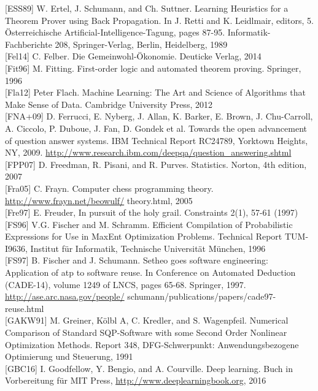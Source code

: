 \documentclass[10pt]{article}
\begin{document}
[ESS89] W. Ertel, J. Schumann, and Ch. Suttner. Learning Heuristics for a Theorem Prover using Back Propagation. In J. Retti and K. Leidlmair, editors, 5. Österreichische Artificial-Intelligence-Tagung, pages 87-95. Informatik-Fachberichte 208, Springer-Verlag, Berlin, Heidelberg, 1989\\[0pt]
[Fel14] C. Felber. Die Gemeinwohl-Ökonomie. Deuticke Verlag, 2014\\[0pt]
[Fit96] M. Fitting. First-order logic and automated theorem proving. Springer, 1996\\[0pt]
[Fla12] Peter Flach. Machine Learning: The Art and Science of Algorithms that Make Sense of Data. Cambridge University Press, 2012\\[0pt]
[FNA+09] D. Ferrucci, E. Nyberg, J. Allan, K. Barker, E. Brown, J. Chu-Carroll, A. Ciccolo, P. Duboue, J. Fan, D. Gondek et al. Towards the open advancement of question answer systems. IBM Technical Report RC24789, Yorktown Heights, NY, 2009. \href{http://www.research.ibm.com/deepqa/question_answering.shtml}{http://www.research.ibm.com/deepqa/question\_answering.shtml}\\[0pt]
[FPP07] D. Freedman, R. Pisani, and R. Purves. Statistics. Norton, 4th edition, 2007\\[0pt]
[Fra05] C. Frayn. Computer chess programming theory. \href{http://www.frayn.net/beowulf/}{http://www.frayn.net/beowulf/} theory.html, 2005\\[0pt]
[Fre97] E. Freuder, In pursuit of the holy grail. Constraints 2(1), 57-61 (1997)\\[0pt]
[FS96] V.G. Fischer and M. Schramm. Efficient Compilation of Probabilistic Expressions for Use in MaxEnt Optimization Problems. Technical Report TUM-I9636, Institut für Informatik, Technische Universität München, 1996\\[0pt]
[FS97] B. Fischer and J. Schumann. Setheo goes software engineering: Application of atp to software reuse. In Conference on Automated Deduction (CADE-14), volume 1249 of LNCS, pages 65-68. Springer, 1997. \href{http://ase.arc.nasa.gov/people/}{http://ase.arc.nasa.gov/people/} schumann/publications/papers/cade97-reuse.html\\[0pt]
[GAKW91] M. Greiner, Kölbl A, C. Kredler, and S. Wagenpfeil. Numerical Comparison of Standard SQP-Software with some Second Order Nonlinear Optimization Methods. Report 348, DFG-Schwerpunkt: Anwendungsbezogene Optimierung und Steuerung, 1991\\[0pt]
[GBC16] I. Goodfellow, Y. Bengio, and A. Courville. Deep learning. Buch in Vorbereitung für MIT Press, \href{http://www.deeplearningbook.org}{http://www.deeplearningbook.org}, 2016\\[0pt]
\end{document}
